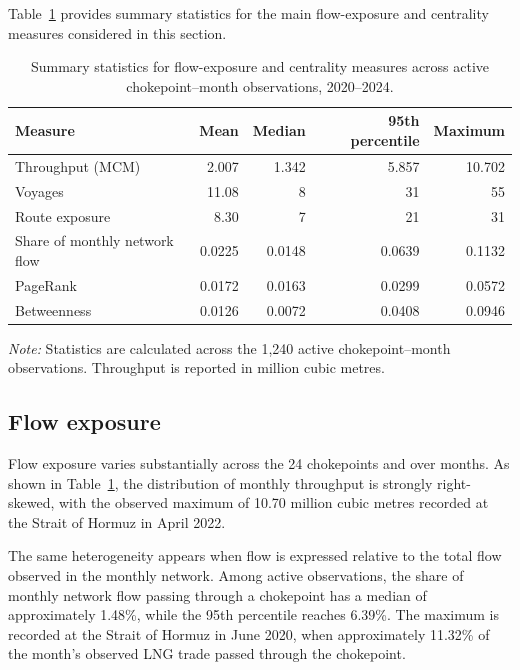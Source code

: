 \documentclass[pdftex,12pt,openright,a4paper,oneside]{book}
\begin{document}
Table~\ref{tab:chokepoint_monthly_measures} provides summary
statistics for the main flow-exposure and centrality measures considered
in this section.

\begin{table}[htbp]
\centering
\small
\setlength{\tabcolsep}{4pt}
\caption{Summary statistics for flow-exposure and centrality measures across active chokepoint--month observations, 2020--2024.}
\label{tab:chokepoint_monthly_measures}
\begin{tabular}{lrrrr}
\toprule
Measure & Mean & Median & 95th percentile & Maximum \tabularnewline
\midrule
Throughput (MCM) & 2.007 & 1.342 & 5.857 & 10.702 \tabularnewline
Voyages & 11.08 & 8 & 31 & 55 \tabularnewline
Route exposure & 8.30 & 7 & 21 & 31 \tabularnewline
Share of monthly network flow & 0.0225 & 0.0148 & 0.0639 & 0.1132 \tabularnewline
PageRank & 0.0172 & 0.0163 & 0.0299 & 0.0572 \tabularnewline
Betweenness & 0.0126 & 0.0072 & 0.0408 & 0.0946 \tabularnewline
\bottomrule
\end{tabular}

\medskip

\begin{minipage}{0.95\textwidth}
\footnotesize
\textit{Note:} Statistics are calculated across the 1,240 active chokepoint--month observations. Throughput is reported in million cubic metres.
\end{minipage}
\end{table}

\subsection{Flow exposure}
\label{subsec:chokepoint_flow_exposure}

Flow exposure varies substantially across the 24 chokepoints and over months. As shown in Table~\ref{tab:chokepoint_monthly_measures}, the distribution of monthly throughput is strongly right-skewed, with the observed maximum of 10.70 million cubic metres recorded at the Strait of Hormuz in April 2022.

The same heterogeneity appears when flow is expressed relative to the total flow observed in the monthly network. 
Among active observations, the share of monthly network flow passing through a chokepoint has a median of approximately 1.48\%, while the 95th percentile reaches 6.39\%. 
The maximum is recorded at the Strait of Hormuz in June 2020, when approximately 11.32\% of the month's observed LNG trade passed through the chokepoint.
\end{document}
